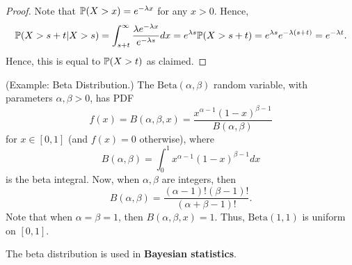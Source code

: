 \begin{mdframed}[]
    \begin{proof}
        Note that $\mathbb{P}(X > x) = e^{-\lambda x}$ for any $x > 0$. Hence, 
        \[\mathbb{P}(X > s + t | X > s) = \int_{s + t}^{\infty} \frac{\lambda e^{-\lambda x}}{e^{-\lambda s}} dx = e^{\lambda s} \mathbb{P}(X > s + t) = e^{\lambda s} e^{-\lambda (s + t)} = e^{-\lambda t}.\]
        Hence, this is equal to $\mathbb{P}(X > t)$ as claimed. 
    \end{proof}
\end{mdframed}

\begin{mdframed}[]
    (Example: Beta Distribution.) The $\text{Beta}(\alpha, \beta)$ random variable, with parameters $\alpha, \beta > 0$, has PDF 
    \[f(x) = B(\alpha, \beta, x) = \frac{x^{\alpha - 1}(1 - x)^{\beta - 1}}{B(\alpha, \beta)}\]
    for $x \in [0, 1]$ (and $f(x) = 0$ otherwise), where 
    \[B(\alpha, \beta) = \int_{0}^{1} x^{\alpha - 1}(1 - x)^{\beta - 1} dx\]
    is the beta integral. Now, when $\alpha, \beta$ are integers, then 
    \[B(\alpha, \beta) = \frac{(\alpha - 1)!(\beta - 1)!}{(\alpha + \beta - 1)!}.\] 
    Note that when $\alpha = \beta = 1$, then $B(\alpha, \beta, x) = 1$. Thus, $\text{Beta}(1, 1)$ is uniform on $[0, 1]$. 
\end{mdframed}
The beta distribution is used in \textbf{Bayesian statistics}. 
